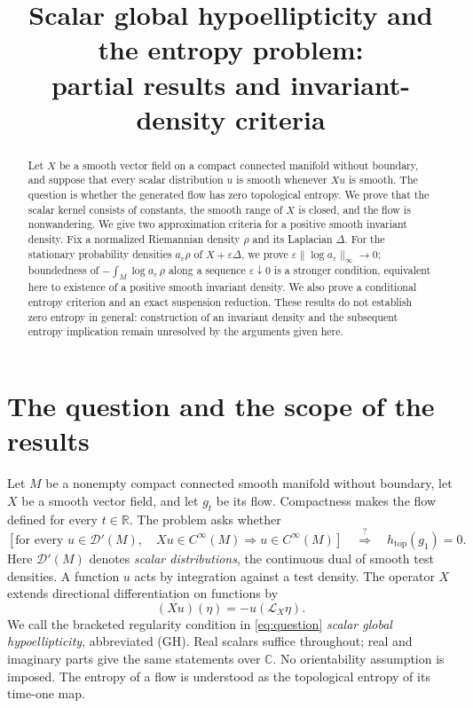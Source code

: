 \documentclass[11pt]{article}
\title{Scalar global hypoellipticity and the entropy problem:\\partial results and invariant-density criteria}
\author{}
\date{}
\theoremstyle{definition}
\theoremstyle{remark}
\newcommand{\R}{\mathbb R}
\newcommand{\D}{\mathcal D'}
\newcommand{\eps}{\varepsilon}
\newcommand{\htop}{h_{\mathrm{top}}}
\begin{document}
\maketitle

\begin{abstract}
Let $X$ be a smooth vector field on a compact connected manifold without boundary, and suppose that every scalar distribution $u$ is smooth whenever $Xu$ is smooth. The question is whether the generated flow has zero topological entropy. We prove that the scalar kernel consists of constants, the smooth range of $X$ is closed, and the flow is nonwandering. We give two approximation criteria for a positive smooth invariant density. Fix a normalized Riemannian density $\rho$ and its Laplacian $\Delta$. For the stationary probability densities $a_\eps\rho$ of $X+\eps\Delta$, we prove $\eps\|\log a_\eps\|_\infty\to0$; boundedness of $-\int_M\log a_\eps\,\rho$ along a sequence $\eps\downarrow0$ is a stronger condition, equivalent here to existence of a positive smooth invariant density. We also prove a conditional entropy criterion and an exact suspension reduction. These results do not establish zero entropy in general: construction of an invariant density and the subsequent entropy implication remain unresolved by the arguments given here.
\end{abstract}

\section{The question and the scope of the results}

Let $M$ be a nonempty compact connected smooth manifold without boundary, let $X$ be a smooth vector field, and let $g_t$ be its flow. Compactness makes the flow defined for every $t\in\R$. The problem asks whether
\begin{equation}\label{eq:question}
 \left[\text{for every }u\in\D(M),\quad
 Xu\in C^\infty(M)\Longrightarrow u\in C^\infty(M)\right]
 \quad\stackrel{?}{\Longrightarrow}\quad \htop(g_1)=0.
\end{equation}
Here $\D(M)$ denotes \emph{scalar distributions}, the continuous dual of smooth test densities. A function $u$ acts by integration against a test density. The operator $X$ extends directional differentiation on functions by
\[
 (Xu)(\eta)=-u(\mathcal L_X\eta).
\]
We call the bracketed regularity condition in \eqref{eq:question} \emph{scalar global hypoellipticity}, abbreviated (GH). Real scalars suffice throughout; real and imaginary parts give the same statements over $\mathbb C$. No orientability assumption is imposed. The entropy of a flow is understood as the topological entropy of its time-one map.
\end{document}
